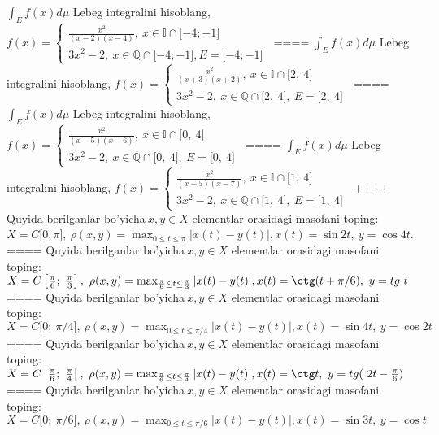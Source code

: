 \(\int_{E}^{}f(x)d\mu\) Lebeg integralini hisoblang, \(f(x) = \left\{ \begin{matrix}
\frac{x^{2}}{(x - 2)(x - 4)},\ x \in \mathbb{I} \cap \lbrack - 4; - 1\rbrack \\
3x^{2} - 2,\ x\mathbb{\in Q \cap}\lbrack - 4; - 1\rbrack,E = \lbrack - 4; - 1\rbrack
\end{matrix} \right.\ \)
====
\(\int_{E}^{}f(x)d\mu\) Lebeg integralini hisoblang, \(f(x) = \left\{ \begin{matrix}
\frac{x^{2}}{(x + 3)(x + 2)},\ x \in \mathbb{I} \cap \lbrack 2,\ 4\rbrack \\
3x^{2} - 2,\ x\mathbb{\in Q \cap}\lbrack 2,\ 4\rbrack,\ E = \lbrack 2,\ 4\rbrack
\end{matrix} \right.\ \)
====
\(\int_{E}^{}f(x)d\mu\) Lebeg integralini hisoblang, \(f(x) = \left\{ \begin{matrix}
\frac{x^{2}}{(x - 5)(x - 6)},\ x \in \mathbb{I} \cap \lbrack 0,\ 4\rbrack \\
3x^{2} - 2,\ x\mathbb{\in Q \cap}\lbrack 0,\ 4\rbrack,\ E = \lbrack 0,\ 4\rbrack
\end{matrix} \right.\ \)
====
\(\int_{E}^{}f(x)d\mu\) Lebeg integralini hisoblang, \(f(x) = \left\{ \begin{matrix}
\frac{x^{2}}{(x - 5)(x - 7)},\ x \in \mathbb{I} \cap \lbrack 1,\ 4\rbrack \\
3x^{2} - 2,\ x\mathbb{\in Q \cap}\lbrack 1,\ 4\rbrack,\ E = \lbrack 1,\ 4\rbrack
\end{matrix} \right.\ \)
++++
Quyida berilganlar bo'yicha\(\ x,y \in X\) elementlar orasidagi masofani toping: \(X = C\lbrack 0,\pi\rbrack,\ \rho(x,y) = \max_{0 \leq t \leq \pi}|x(t) - y(t)|,x(t) = \sin2t,\ y = \cos4t\).
====
Quyida berilganlar bo'yicha\(\ x,y \in X\) elementlar orasidagi masofani toping: \(X = C\left\lbrack \frac{\pi}{6};\ \frac{\pi}{3} \right\rbrack,\ \rho(x,y) = \max_{\frac{\pi}{6} \leq t \leq \frac{\pi}{3}}|x(t) - y(t)|,x(t) = \ctg (t + \pi/6),\ y = tg\ t\)
====
Quyida berilganlar bo'yicha\(\ x,y \in X\) elementlar orasidagi masofani toping: \(X = C\lbrack 0;\ \pi/4\rbrack,\ \rho(x,y) = \max_{0 \leq t \leq \pi/4}|x(t) - y(t)|,x(t) = \sin4t,\ y = \cos2t\)
====
Quyida berilganlar bo'yicha\(\ x,y \in X\) elementlar orasidagi masofani toping: \(X = C\left\lbrack \frac{\pi}{6};\ \frac{\pi}{4} \right\rbrack,\ \rho(x,y) = \max_{\frac{\pi}{6} \leq t \leq \frac{\pi}{4}}|x(t) - y(t)|,x(t) = \ctg t,\ y = tg(\ 2t - \frac{\pi}{6})\)
====
Quyida berilganlar bo'yicha\(\ x,y \in X\) elementlar orasidagi masofani toping: \(X = C\lbrack 0;\ \pi/6\rbrack,\ \rho(x,y) = \max_{0 \leq t \leq \pi/6}|x(t) - y(t)|,x(t) = \sin3t,\ y = \cos t\)
